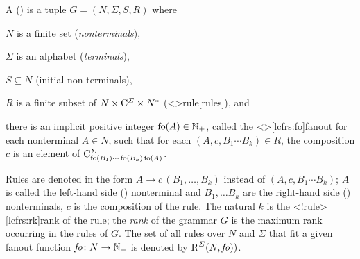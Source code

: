 \documentclass[../../document.tex]{subfiles}
\begin{document}
    \begin{definition}
        A  ()%
        is a tuple \(G=(N, \varSigma, S, R)\) where
        \begin{compactenum}
            \item \(N\) is a finite set (\emph{nonterminals}),
            \item \(\varSigma\) is an alphabet (\emph{terminals}),
            \item \(S \subseteq N\) (initial non-terminals),
            \item \(R\) is a finite subset of \(N \times \mathrm{C}^\varSigma \times N^*\) (<\lcfrs>{rule}[rules]), and
            \item there is an implicit positive integer \(\operatorname{fo}(A) \in \mathbb{N}_+\), called the <\lcfrs>[lcfrs:fo]{fanout} for each nonterminal \(A \in N\), such that
            for each \((A, c, B_1\cdots B_k) \in R\), the  composition \(c\) is an element of \(\mathrm{C}^\varSigma_{\operatorname{fo}(B_1) \cdots \operatorname{fo}(B_k) \operatorname{fo}(A)}\).
        \end{compactenum}

        Rules are denoted in the form \(A \to c\,(B_1, \ldots, B_k)\) instead of \((A, c, B_1 \cdots B_k)\); \(A\) is called the left-hand side () nonterminal and \(B_1, \ldots B_k\) are the right-hand side () nonterminals, \(c\) is the composition of the rule.
        The natural \(k\) is the <\lcfrs!rule>[lcfrs:rk]{rank} of the rule; the \emph{rank} of the grammar \(G\) is the maximum rank occurring in the rules of \(G\).
        The set of all rules over \(N\) and \(\varSigma\) that fit a given fanout function \(\mathit{fo}\colon N \to \mathbb{N}_+\) is denoted by \(\operatorname{R}^\varSigma(N, \mathit{fo}))\).
    \end{definition}
\end{document}
